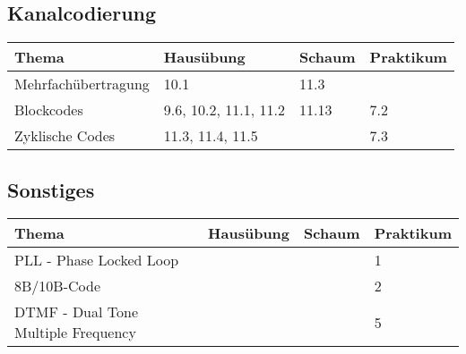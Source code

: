 \subsection{Kanalcodierung}
	\begin{tabular}{|p{9cm}|p{2.5cm}|p{3.5cm}|p{2cm}|}
	\hline
	\textbf{Thema} & \textbf{Hausübung} & \textbf{Schaum} & \textbf{Praktikum} \\ 
	\hline
	\hline
	Mehrfachübertragung & 10.1 & 11.3 & \\
	\hline
	Blockcodes & 9.6, 10.2, 11.1, 11.2 & 11.13 & 7.2\\
	\hline
	Zyklische Codes & 11.3, 11.4, 11.5 & & 7.3\\
	\hline
	\end{tabular}
\subsection{Sonstiges}
	\begin{tabular}{|p{9cm}|p{2.5cm}|p{3.5cm}|p{2cm}|}
	\hline  
	\textbf{Thema} & \textbf{Hausübung} & \textbf{Schaum} & \textbf{Praktikum} \\ 
	\hline
	\hline
	PLL - Phase Locked Loop	& & & 1 \\
	\hline
	8B/10B-Code & & & 2 \\
	\hline
	DTMF - Dual Tone Multiple Frequency & & & 5\\
	\hline
	\end{tabular}
